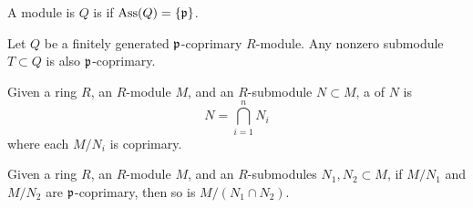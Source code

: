 \documentclass{ximera}
\begin{document}
\begin{definition}
  A module is $Q$ is  if $\operatorname{Ass}(Q) = \{\mathfrak{p}\}$.
\end{definition}

\begin{lemma}
  Let $Q$ be a finitely generated $\mathfrak{p}$-coprimary $R$-module. Any
  nonzero submodule $T\subset Q$ is also $\mathfrak{p}$-coprimary.
  \begin{sketch}
  \end{sketch}
\end{lemma}




\begin{definition}
  Given a ring $R$, an $R$-module $M$, and an $R$-submodule $N\subset
  M$, a  of $N$ is
  \[
  N = \bigcap_{i=1}^n N_i
  \]
  where each $M/N_i$ is coprimary. 
\end{definition}


\begin{lemma}\label{L:intersectcoprimary}
  Given a ring $R$, an $R$-module $M$, and an $R$-submodules $N_1,N_2\subset
  M$, if $M/N_1$ and $M/N_2$ are $\mathfrak{p}$-coprimary, then so is $M/(N_1\cap N_2)$.
\end{lemma}
\end{document}
